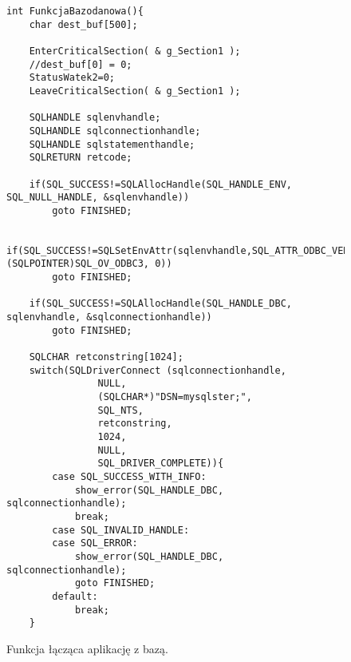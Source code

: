 \documentclass[a4paper,twoside,12pt]{mgr}
\begin{document}
\begin{figure}[H]
\centering
\begin{lstlisting}[frame=single]
int FunkcjaBazodanowa(){
	char dest_buf[500];
	
	EnterCriticalSection( & g_Section1 );
	//dest_buf[0] = 0;
	StatusWatek2=0;
	LeaveCriticalSection( & g_Section1 );
	
    SQLHANDLE sqlenvhandle;    
    SQLHANDLE sqlconnectionhandle;
    SQLHANDLE sqlstatementhandle;
    SQLRETURN retcode;

    if(SQL_SUCCESS!=SQLAllocHandle(SQL_HANDLE_ENV, SQL_NULL_HANDLE, &sqlenvhandle))
        goto FINISHED;

    if(SQL_SUCCESS!=SQLSetEnvAttr(sqlenvhandle,SQL_ATTR_ODBC_VERSION, (SQLPOINTER)SQL_OV_ODBC3, 0)) 
        goto FINISHED;
    
    if(SQL_SUCCESS!=SQLAllocHandle(SQL_HANDLE_DBC, sqlenvhandle, &sqlconnectionhandle))
        goto FINISHED;

    SQLCHAR retconstring[1024];
    switch(SQLDriverConnect (sqlconnectionhandle, 
                NULL, 
                (SQLCHAR*)"DSN=mysqlster;", 
                SQL_NTS, 
                retconstring, 
                1024, 
                NULL,
                SQL_DRIVER_COMPLETE)){
        case SQL_SUCCESS_WITH_INFO:
            show_error(SQL_HANDLE_DBC, sqlconnectionhandle);
            break;
        case SQL_INVALID_HANDLE:
        case SQL_ERROR:
            show_error(SQL_HANDLE_DBC, sqlconnectionhandle);
            goto FINISHED;
        default:
            break;
    }
  \end{lstlisting}
\caption{Funkcja łącząca aplikację z bazą.}%
\label{rys:etykieta}
\end{figure}
    
\end{document}
